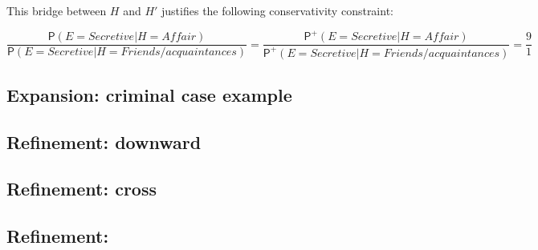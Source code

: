 \documentclass[
  11pt,
  dvipsnames,enabledeprecatedfontcommands]{scrartcl}
\newcommand{\pr}[1]{\ensuremath{\mathsf{P}(#1)}}
\newcommand{\ppr}[2]{\ensuremath{\mathsf{P}^{#1}(#2)}}
\begin{document}
This bridge between \(H\) and \(H'\) justifies the following
conservativity constraint:

\[\frac{\pr{E=\textit{Secretive}\vert H=\textit{Affair}}}{\pr{E=\textit{Secretive}\vert H=\textit{Friends/acquaintances}}} = \frac{\ppr{+}{E=\textit{Secretive}\vert H=\textit{Affair}}}{\ppr{+}{E=\textit{Secretive}\vert H=\textit{Friends/acquaintances}}}=\frac{9}{1} \]

\hypertarget{expansion-criminal-case-example}{%
\subsection{Expansion: criminal case
example}\label{expansion-criminal-case-example}}

\hypertarget{refinement-downward}{%
\subsection{Refinement: downward}\label{refinement-downward}}

\hypertarget{refinement-cross}{%
\subsection{Refinement: cross}\label{refinement-cross}}

\hypertarget{refinement}{%
\subsection{Refinement:}\label{refinement}}
\end{document}
